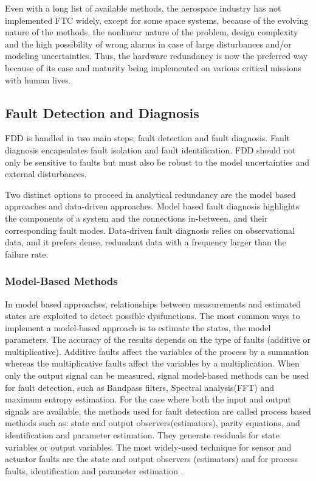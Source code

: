 Even with a long list of available methods, the aerospace industry has not implemented 
FTC widely, except for some space systems, because of the evolving nature of the methods, 
the nonlinear nature of the problem, design complexity and the high possibility of wrong alarms in case of large disturbances and/or modeling uncertainties. 
Thus, the hardware redundancy is now the preferred way because of its ease and maturity being implemented on various critical missions with human lives.

\subsection{Fault Detection and Diagnosis}

FDD is handled in two main steps; fault detection and fault diagnosis. Fault diagnosis 
encapsulates fault isolation and fault identification. FDD should 
not only be sensitive to faults but must also be robust to the model uncertainties and 
external disturbances.

Two distinct options to proceed in analytical redundancy are the model based 
approaches and data-driven approaches.
Model based fault diagnosis highlights the components of a system and the connections 
in-between, and their corresponding fault modes. 
Data-driven fault diagnosis relies on observational data, and it prefers dense, redundant data with a frequency larger than the failure rate. 

%

\subsubsection{Model-Based Methods}

In model based approaches, relationships between measurements and estimated 
states are exploited to detect possible dysfunctions. The most common ways to 
implement a model-based approach is to estimate the states, the model 
parameters. The accuracy of the results depends on the type of 
faults (additive or multiplicative). Additive faults affect the variables of the process 
by a summation whereas the multiplicative faults affect the variables by a multiplication.
When only the output signal can be measured, signal model-based methods can be used for 
fault detection, such as Bandpass filters, Spectral analysis(FFT) and maximum entropy estimation. 
For the case where both the input and output signals are available, the methods used 
for fault detection are called process based methods such as: state and output 
observers(estimators), parity equations, and identification and parameter estimation. 
They generate residuals for state variables or output variables. 
The most widely-used technique for sensor and actuator faults are the state and output observers (estimators) and for process faults, identification and parameter estimation \cite{isermann1997trends}.

